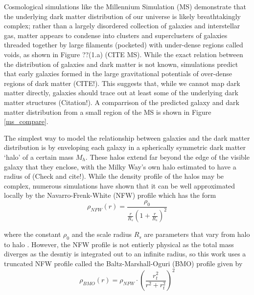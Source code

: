 \documentclass[%
 reprint,
 amsmath,amssymb,
 aps,nofootinbib
]{revtex4-1}
\begin{document}

Cosmological simulations like the Millennium Simulation (MS) demonstrate that the underlying dark matter distribution of our universe is likely breathtakingly complex; rather than a largely disordered collection of galaxies and interstellar gas, matter appears to condense into clusters and superclusters of galaxies threaded together by large filaments (pocketed) with under-dense regions called voids, as shown in Figure ??(1.a) (CITE MS). While the exact relation between the distribution of galaxies and dark matter is not known, simulations predict that early galaxies formed in the large gravitational potentials of over-dense regions of dark matter (CITE!). This suggests that, while we cannot map dark matter directly, galaxies should trace out at least some of the underlying dark matter structures (Citation!). A comparrison of the predicted galaxy and dark matter distribution from a small region of the MS is shown in Figure \ref{ms_compare}.


The simplest way to model the relationship between galaxies and the dark matter distribution is by enveloping each galaxy in a spherically symmetric dark matter `halo' of a certain mass $M_h$. These halos extend far beyond the edge of the visible galaxy that they enclose, with the Milky Way's own halo estimated to have a radius of (Check and cite!). While the density profile of the halos may be complex, numerous simulations have shown that it can be well approximated locally by the Navarro-Frenk-White (NFW) profile which has the form
\begin{equation}\label{nfw_profile}
\rho_{NFW}(r)=\frac{\rho_0}{\frac{r}{R_s}\left(1+\frac{r}{R_s}\right)^2}
\end{equation}

\noindent where the constant $\rho_0$ and the scale radius $R_s$ are parameters that vary from halo to halo \cite{nfw}. However, the NFW profile is not entierly physical as the total mass diverges as the desntiy is integrated out to an infinite radius, so this work uses a truncated NFW profile called the Baltz-Marshall-Oguri (BMO) profile given by
\begin{equation}\label{bmo_profile}
\rho_{BMO}(r)=\rho_{NFW}\cdot\left(\frac{r_t^2}{r^2+r_t^2}\right)^2
\end{equation}
\end{document}
